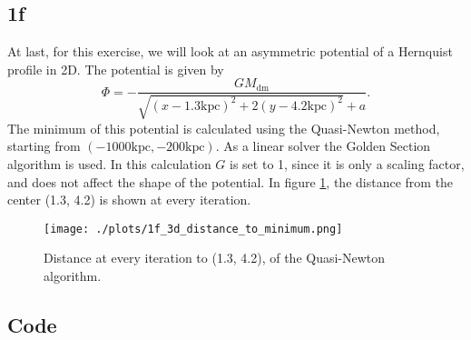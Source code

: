 \subsection*{1f}
At last, for this exercise, we will look at an asymmetric potential of a Hernquist profile in 2D. The potential is given by
\begin{equation}
  \Phi = - \frac{GM_\mathrm{dm}}{\sqrt{(x-1.3\mathrm{kpc})^2 + 2(y-4.2\mathrm{kpc})^2}+a}.
\end{equation}
The minimum of this potential is calculated using the Quasi-Newton method, starting from $(-1000 \mathrm{kpc}, -200\mathrm{kpc})$. As a linear solver the Golden Section algorithm is used. In this calculation $G$ is set to 1, since it is only a scaling factor, and does not affect the shape of the potential. In figure \ref{fig:1f}, the distance from the center (1.3, 4.2) is shown at every iteration.

\begin{figure}[!ht]
  \centering
  \texttt{[image: ./plots/1f\_3d\_distance\_to\_minimum.png]}
  \caption{Distance at every iteration to (1.3, 4.2), of the Quasi-Newton algorithm.}
  \label{fig:1f}
\end{figure}


\pagebreak

\subsection*{Code}



\newpage